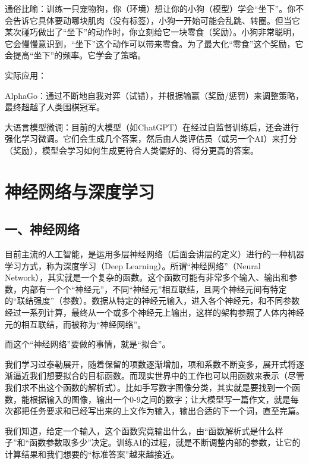 通俗比喻：训练一只宠物狗，你（环境）想让你的小狗（模型）学会``坐下''。你不会告诉它具体要动哪块肌肉（没有标签），小狗一开始可能会乱跳、转圈。但当它某次碰巧做出了``坐下''的动作时，你立刻给它一块零食（奖励）。小狗非常聪明，它会慢慢意识到，``坐下''这个动作可以带来零食。为了最大化``零食''这个奖励，它会提高``坐下''的频率。它学会了策略。

实际应用：

AlphaGo：通过不断地自我对弈（试错），并根据输赢（奖励/惩罚）来调整策略，最终超越了人类围棋冠军。

大语言模型微调：目前的大模型（如ChatGPT）在经过自监督训练后，还会进行强化学习微调。它们会生成几个答案，然后由人类评估员（或另一个AI）来打分（奖励），模型会学习如何生成更符合人类偏好的、得分更高的答案。

\clearpage

\hypertarget{ux795eux7ecfux7f51ux7edcux4e0eux6df1ux5ea6ux5b66ux4e60}{%
\section{神经网络与深度学习}\label{ux795eux7ecfux7f51ux7edcux4e0eux6df1ux5ea6ux5b66ux4e60}}

\hypertarget{ux4e00ux795eux7ecfux7f51ux7edc}{%
\subsection{一、神经网络}\label{ux4e00ux795eux7ecfux7f51ux7edc}}

目前主流的人工智能，是运用多层神经网络（后面会讲层的定义）进行的一种机器学习方式，称为深度学习（Deep Learning）。所谓``神经网络''（Neural Network），其实就是一个复杂的函数。这个函数可能有非常多个输入、输出和参数，内部有一个个``神经元''，不同``神经元''相互联结，且两个神经元间有特定的``联结强度''（参数）。数据从特定的神经元输入，进入各个神经元，和不同参数经过一系列计算，最终从一个或多个神经元上输出，这样的架构参照了人体内神经元的相互联结，而被称为``神经网络''。

而这个``神经网络''要做的事情，就是``拟合''。

我们学习过泰勒展开，随着保留的项数逐渐增加，项和系数不断变多，展开式将逐渐逼近我们想要拟合的目标函数。而现实世界中的工作也可以用函数来表示（尽管我们求不出这个函数的解析式）。比如手写数字图像分类，其实就是要找到一个函数，能根据输入的图像，输出一个0-9之间的数字；让大模型写一篇作文，就是每次都把任务要求和已经写出来的上文作为输入，输出合适的下一个词，直至完篇。

我们知道，给定一个输入，这个函数究竟输出什么，由``函数解析式是什么样子''和``函数参数取多少''决定。训练AI的过程，就是不断调整内部的参数，让它的计算结果和我们想要的``标准答案''越来越接近。


